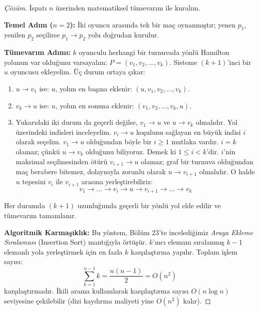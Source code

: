 \begin{proof}[Çözüm]
İspatı $n$ üzerinden matematiksel tümevarım ile kuralım.

\textbf{Temel Adım ($n=2$):}
İki oyuncu arasında tek bir maç oynanmıştır; yenen $p_1$, yenilen $p_2$ seçilirse $p_1 \to p_2$ yolu doğrudan kurulur.

\textbf{Tümevarım Adımı:}
$k$ oyunculu herhangi bir turnuvada yönlü Hamilton yolunun var olduğunu varsayalım: $P = (v_1, v_2, \dots, v_k)$.
Sisteme $(k+1)$'inci bir $u$ oyuncusu ekleyelim.
Üç durum ortaya çıkar:
\begin{enumerate}
    \item $u \to v_1$ ise: $u$, yolun en başına eklenir: $(u, v_1, v_2, \dots, v_k)$.
    \item $v_k \to u$ ise: $u$, yolun en sonuna eklenir: $(v_1, v_2, \dots, v_k, u)$.
    \item Yukarıdaki iki durum da geçerli değilse, $v_1 \to u$ ve $u \to v_k$ olmalıdır.
    Yol üzerindeki indisleri inceleyelim. $v_i \to u$ koşulunu sağlayan en büyük indisi $i$ olarak seçelim.
    $v_1 \to u$ olduğundan böyle bir $i \ge 1$ mutlaka vardır.
    $i = k$ olamaz; çünkü $u \to v_k$ olduğunu biliyoruz. Demek ki $1 \le i < k$'dir.
$i$'nin maksimal seçilmesinden ötürü $v_{i+1} \to u$ olamaz; graf bir turnuva olduğundan maç berabere bitemez, dolayısıyla zorunlu olarak $u \to v_{i+1}$ olmalıdır.
    O halde $u$ tepesini $v_i$ ile $v_{i+1}$ arasına yerleştirebiliriz:
    \[
    v_1 \to \dots \to v_i \to u \to v_{i+1} \to \dots \to v_k
    \]
\end{enumerate}
Her durumda $(k+1)$ uzunluğunda geçerli bir yönlü yol elde edilir ve tümevarım tamamlanır.

\textbf{Algoritmik Karmaşıklık:}
Bu yöntem, Bölüm 23'te incelediğimiz \emph{Araya Ekleme Sıralaması} (Insertion Sort) mantığıyla örtüşür. $k$'ıncı elemanı sıralanmış $k-1$ elemanlı yola yerleştirmek için en fazla $k$ karşılaştırma yapılır.
Toplam işlem sayısı:
\[
\sum_{k=1}^{n-1} k = \frac{n(n-1)}{2} = O(n^2)
\]
karşılaştırmadır. İkili arama kullanılarak karşılaştırma sayısı $O(n \log n)$ seviyesine çekilebilir (dizi kaydırma maliyeti yine $O(n^2)$ kalır).
\end{proof}

